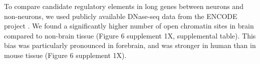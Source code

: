 To compare candidate regulatory elements in long genes between neurons and non-neurons, we used publicly available DNase-seq data from the ENCODE project \cite{Dunham_2012}. We found a significantly higher number of open chromatin sites in brain compared to non-brain tissue (Figure 6 supplement 1X, supplemental table). This bias was  particularly pronounced in forebrain, and was stronger in human than in mouse tissue (Figure 6 supplement 1X).